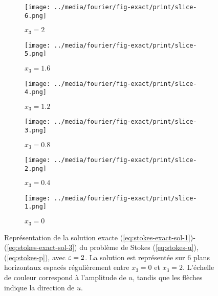 \begin{figure}[t]
  \begin{center}
    \begin{subfigure}[b]{0.49\textwidth}
      \texttt{[image: ../media/fourier/fig-exact/print/slice-6.png]}
      \caption{$x_3 = 2$}
    \end{subfigure}
    \begin{subfigure}[b]{0.49\textwidth}
      \texttt{[image: ../media/fourier/fig-exact/print/slice-5.png]}
      \caption{$x_3 = 1.6$}
    \end{subfigure}
    \begin{subfigure}[b]{0.49\textwidth}
      \texttt{[image: ../media/fourier/fig-exact/print/slice-4.png]}
      \caption{$x_3 = 1.2$}
    \end{subfigure}
    \begin{subfigure}[b]{0.49\textwidth}
      \texttt{[image: ../media/fourier/fig-exact/print/slice-3.png]}
      \caption{$x_3 = 0.8$}
    \end{subfigure}
    \begin{subfigure}[b]{0.49\textwidth}
      \texttt{[image: ../media/fourier/fig-exact/print/slice-2.png]}
      \caption{$x_3 = 0.4$}
    \end{subfigure}
    \begin{subfigure}[b]{0.49\textwidth}
      \texttt{[image: ../media/fourier/fig-exact/print/slice-1.png]}
      \caption{$x_3 = 0$}
    \end{subfigure}
    \caption{Représentation de la solution exacte
      (\ref{eq:stokes-exact-sol-1})-(\ref{eq:stokes-exact-sol-3}) du
      problème de Stokes (\ref{eq:stokes-u}), (\ref{eq:stokes-p}),
      avec $\varepsilon = 2$. La
      solution est représentée sur 6 plans horizontaux espacés
      régulièrement entre $x_3 = 0$ et $x_3 = 2$. L'échelle de couleur
      correspond à l'amplitude de $u$, tandis que les flèches indique
      la direction de $u$.}
    \label{fig:stokes-exact-sol}
  \end{center}
\end{figure}

